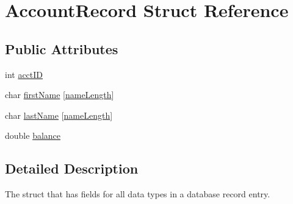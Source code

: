 \hypertarget{struct_account_record}{\section{\-Account\-Record \-Struct \-Reference}
\label{struct_account_record}
}
\subsection*{\-Public \-Attributes}
\begin{DoxyCompactItemize}
\item 
int \hyperlink{struct_account_record_a587aa92adcd387d37427cd19c69e5932}{acct\-I\-D}
\item 
char \hyperlink{struct_account_record_a89df48cc152b78efda9060a0cc461dd1}{first\-Name} \mbox{[}\hyperlink{database_8cpp_a5d9687231dabb10b55cd7598e1be6702}{name\-Length}\mbox{]}
\item 
char \hyperlink{struct_account_record_ab9b4c37852573096dd9c81bec70f68b9}{last\-Name} \mbox{[}\hyperlink{database_8cpp_a5d9687231dabb10b55cd7598e1be6702}{name\-Length}\mbox{]}
\item 
double \hyperlink{struct_account_record_a7de857c68a45702a0c1c4720b4570c2a}{balance}
\end{DoxyCompactItemize}


\subsection{\-Detailed \-Description}
\-The struct that has fields for all data types in a database record entry. 

